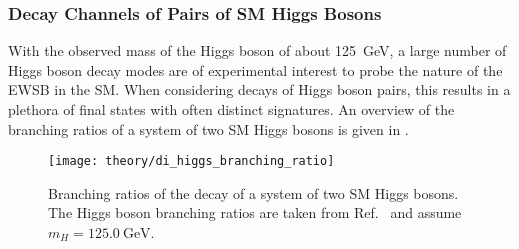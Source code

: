 \subsubsection{Decay Channels of Pairs of SM Higgs Bosons}%

With the observed mass of the Higgs boson of about \SI{125}{\GeV}, a large
number of Higgs boson decay modes are of experimental interest to probe the
nature of the EWSB in the SM. When considering decays of Higgs boson pairs, this
results in a plethora of final states with often distinct signatures. An
overview of the branching ratios of a system of two SM Higgs bosons is given in
.

\begin{figure}[htbp]
  \centering

  \texttt{[image: theory/di\_higgs\_branching\_ratio]}

  \caption[Branching ratios of a system of two SM Higgs bosons.]{Branching
    ratios of the decay of a system of two SM Higgs bosons. The Higgs boson
    branching ratios are taken from Ref.~\cite{deFlorian:2016spz} and
    assume~$m_{H} = \SI{125.0}{\GeV}$.}%
  \label{fig:hh_branching_ratios}
\end{figure}

